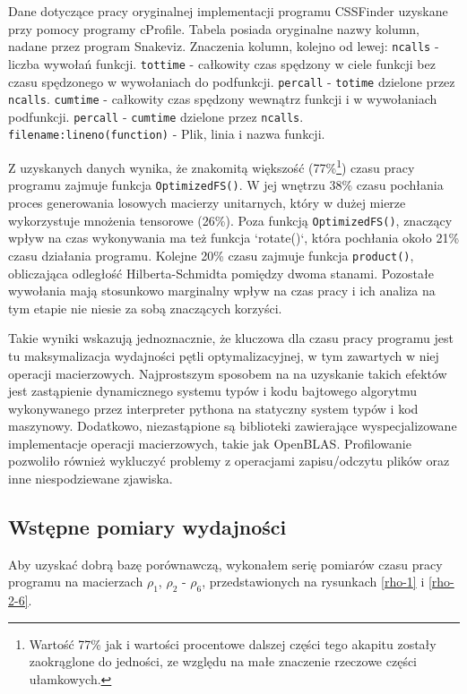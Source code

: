 \documentclass[11pt, a4paper]{article}
\newcommand{\code}[1]{\texttt{#1}}
\begin{document}
\begin{sloppypar}
    \begin{table}[ht]
      \tiny
      \centering
      
      \caption{Dane dotyczące pracy oryginalnej implementacji programu CSSFinder uzyskane przy pomocy programy cProfile. Tabela posiada oryginalne nazwy kolumn, nadane przez program Snakeviz. Znaczenia kolumn, kolejno od lewej: \code{ncalls} - liczba wywołań funkcji. \code{tottime} - całkowity czas spędzony w ciele funkcji bez czasu spędzonego w wywołaniach do podfunkcji. \code{percall} - \code{totime} dzielone przez \code{ncalls}. \code{cumtime} - całkowity czas spędzony wewnątrz funkcji i w wywołaniach podfunkcji. \code{percall} - \code{cumtime} dzielone przez \code{ncalls}. \code{filename:lineno(function)} - Plik, linia i nazwa funkcji.}
    \end{table}

    Z uzyskanych danych wynika, że znakomitą większość (77\%\footnote{Wartość 77\% jak i
    wartości procentowe dalszej części tego akapitu zostały zaokrąglone do jedności, ze względu
    na małe znaczenie rzeczowe części ułamkowych.}) czasu pracy programu zajmuje funkcja
    \code{OptimizedFS()}. W jej wnętrzu 38\% czasu pochłania proces generowania losowych
    macierzy unitarnych, który w dużej mierze wykorzystuje mnożenia tensorowe (26\%).
    Poza funkcją \code{OptimizedFS()}, znaczący wpływ na czas wykonywania ma też funkcja
    `rotate()`, która pochłania około 21\% czasu działania programu. Kolejne 20\% czasu
    zajmuje funkcja \code{product()}, obliczająca odległość Hilberta-Schmidta pomiędzy
    dwoma stanami. Pozostałe wywołania mają stosunkowo marginalny wpływ na czas pracy i ich
    analiza na tym etapie nie niesie za sobą znaczących korzyści.

    Takie wyniki wskazują jednoznacznie, że kluczowa dla czasu pracy programu jest tu
    maksymalizacja wydajności pętli optymalizacyjnej, w tym zawartych w niej operacji macierzowych.
    Najprostszym sposobem na na uzyskanie takich efektów jest zastąpienie dynamicznego
    systemu typów i kodu bajtowego algorytmu wykonywanego przez interpreter pythona na
    statyczny system typów i kod maszynowy. Dodatkowo, niezastąpione są biblioteki
    zawierające wyspecjalizowane implementacje operacji macierzowych, takie jak OpenBLAS.
    Profilowanie pozwoliło również wykluczyć problemy z operacjami zapisu/odczytu plików
    oraz inne niespodziewane zjawiska.

    \subsection{Wstępne pomiary wydajności}
    Aby uzyskać dobrą bazę porównawczą, wykonałem serię pomiarów czasu pracy programu na
    macierzach $\rho_{1}$, $\rho_{2}$ - $\rho_{6}$, przedstawionych na rysunkach \ref{rho-1}
    i \ref{rho-2-6}.


\end{sloppypar}
\end{document}
